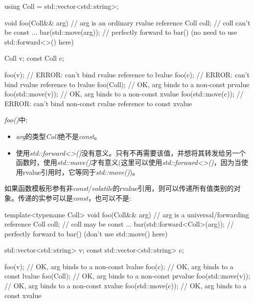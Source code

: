 \begin{codebox}[cpp]
using Coll = std::vector<std::string>;

void foo(Coll&& arg) // arg is an ordinary rvalue reference
{
  Coll coll; // coll can’t be const
  ...
  bar(std::move(arg)); // perfectly forward to bar() (no need to use std::forward<>() here)
}

Coll v;
const Coll c;

foo(v); // ERROR: can’t bind rvalue reference to lvalue
foo(c); // ERROR: can’t bind rvalue reference to lvalue
foo(Coll{}); // OK, arg binds to a non-const prvalue
foo(std::move(v)); // OK, arg binds to a non-const xvalue
foo(std::move(c)); // ERROR: can’t bind non-const rvalue reference to const xvalue
\end{codebox}

\textit{foo()}中:\par

\begin{itemize}
  \item \textit{arg}的类型\textit{Coll}绝不是\textit{const}。
  \item 使用\textit{std::\allowbreak{}forward<\allowbreak{}>(\allowbreak{})\allowbreak{}}没有意义。只有不再需要该值，并想将其转发给另一个函数时，使用\textit{std::move()}才有意义(这里可以使用\textit{std::\allowbreak{}forward<\allowbreak{}>(\allowbreak{})\allowbreak{}}，因为当使用rvalue引用时，它等同于\textit{std::move()})。
\end{itemize}


如果函数模板形参有非\textit{const}/\textit{volatile}的rvalue引用，则可以传递所有值类别的对象。传递的实参可以是\textit{const}，也可以不是:\par

\begin{codebox}[cpp]
template<typename Coll>
void foo(Coll&& arg) // arg is a universal/forwarding reference
{
  Coll coll; // coll may be const
  ...
  bar(std::forward<Coll>(arg)); // perfectly forward to bar() (don’t use std::move() here)
}

std::vector<std::string> v;
const std::vector<std::string> c;

foo(v); // OK, arg binds to a non-const lvalue
foo(c); // OK, arg binds to a const lvalue
foo(Coll{}); // OK, arg binds to a non-const prvalue
foo(std::move(v)); // OK, arg binds to a non-const xvalue
foo(std::move(c)); // OK, arg binds to a const xvalue
\end{codebox}

